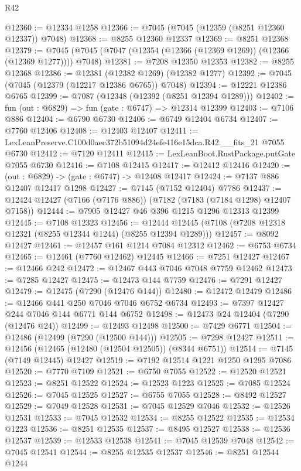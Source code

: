 \begin{lexlean}{R42}
\begin{coremodule}
{@12360 := @12334 @1258
@12366 := @7045 (@7045 (@12359 (@8251 @12360 @12337)) @7048)
@12368 := @8255 @12360 @12337
@12369 := @8251 @12368
@12379 := @7045 (@7045 (@7047 (@12354 (@12366 (@12369 @1269)) (@12366 (@12369 @1277)))) @7048)
@12381 := @7208 @12350 @12353
@12382 := @8255 @12368
@12386 := @12381 (@12382 @1269) (@12382 @1277)
@12392 := @7045 (@7045 (@12379 (@12217 @12386 @6765)) @7048)
@12394 := @12221 @12386 @6765
@12399 := @7087 (@12348 (@12392 (@8251 @12394 @1289)))
@12402 := fun (out : @6829) => fun (gate : @6747) => @12314 @12399
@12403 := @7106 @886
@12404 := @6790 @6730
@12406 := @6749 @12404 @6734
@12407 := @7760 @12406
@12408 := @12403 @12407
@12411 := LexLeanPreserve.C100d0aec372b51094d24efe416e15dca.R42.__fits_21 @7055 @6730
@12412 := @7120 @12411
@12415 := LexLeanBoot.RustPackage.putGate @7055 @6730
@12416 := @7108 @12415
@12417 := @12412 @12416
@12420 := (out : @6829) -> (gate : @6747) -> @12408 @12417
@12424 := @7137 @886 @12407 @12417 @1298
@12427 := @7145 (@7152 @12404) @7786
@12437 := @12424 @12427 (@7166 (@7176 @886)) (@7182 (@7183 (@7184 @1298) @12407 @7158))
@12444 := @7905 @12427 @46 @396 @1215 @1296 @12313 @12399
@12445 := @7108 @12323
@12456 := @12444 @12445 (@7108 (@7208 @12318 @12321 (@8255 @12344 @1244) (@8255 @12394 @1289)))
@12457 := @8092 @12427
@12461 := @12457 @161 @1214 @7084 @12312
@12462 := @6753 @6734
@12465 := @12461 (@7760 @12462) @12445
@12466 := @7251 @12427
@12467 := @12466 @242
@12472 := @12467 @443 @7046 @7048 @7759 @12462
@12473 := @7285 @12427
@12475 := @12473 @144 @7759
@12476 := @7291 @12427
@12479 := @12475 (@7290 (@12476 @144))
@12480 := @12472 @12479
@12486 := @12466 @441 @250 @7046 @7046 @6752 @6734
@12493 := @7397 @12427 @244 @7046 @144 @6771 @144 @6752
@12498 := @12473 @24 @12404 (@7290 (@12476 @24))
@12499 := @12493 @12498
@12500 := @7429 @6771
@12504 := @12486 (@12499 (@7290 (@12500 @144)))
@12505 := @7298 @12427
@12511 := @12456 (@12465 (@12480 (@12504 @12505)) (@8344 @6751))
@12514 := @7145 (@7149 @12445) @12427
@12519 := @7192 @12514 @1221 @1250 @1295 @7086
@12520 := @7770 @7109
@12521 := @6750 @7055
@12522 := @12520 @12521
@12523 := @8251 @12522
@12524 := @12523 @1223
@12525 := @7085 @12524
@12526 := @7045 @12525
@12527 := @6755 @7055
@12528 := @8492 @12527
@12529 := @7049 @12528
@12531 := @7045 @12529 @7046
@12532 := @12526 @12531
@12533 := @7045 @12532
@12534 := @8255 @12522
@12535 := @12534 @1223
@12536 := @8251 @12535
@12537 := @8495 @12527
@12538 := @12536 @12537
@12539 := @12533 @12538
@12541 := @7045 @12539 @7048
@12542 := @7045 @12541
@12544 := @8255 @12535 @12537
@12546 := @8251 @12544 @1244
}
\end{coremodule}
\end{lexlean}

